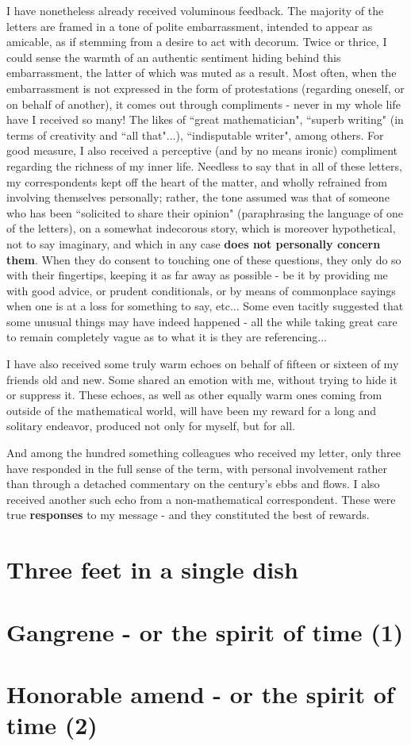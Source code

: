 I have nonetheless already received voluminous feedback. The majority of the letters are framed in a tone of polite embarrassment, intended to appear as amicable, as if stemming from a desire to act with decorum. Twice or thrice, I could sense the warmth of an authentic sentiment hiding behind this embarrassment, the latter of which was muted as a result. Most often, when the embarrassment is not expressed in the form of protestations (regarding oneself, or on behalf of another), it comes out through compliments - never in my whole life have I received so many! The likes of ``great mathematician", ``superb writing" (in terms of creativity and ``all that"...), ``indisputable writer", among others. For good measure, I also received a perceptive (and by no means ironic) compliment regarding the richness of my inner life. Needless to say that in all of these letters, my correspondents kept off the heart of the matter, and wholly refrained from involving themselves personally; rather, the tone assumed was that of someone who has been ``solicited to share their opinion" (paraphrasing the language of one of the letters), on a somewhat indecorous story, which is moreover hypothetical, not to say imaginary, and which in any case \textbf{does not personally concern them}. When they do consent to touching one of these questions, they only do so with their fingertips, keeping it as far away as possible - be it by providing me with good advice, or prudent conditionals, or by means of commonplace sayings when one is at a loss for something to say, etc... Some even tacitly suggested that some unusual things may have indeed happened - all the while taking great care to remain completely vague as to what it is they are referencing...

I have also received some truly warm echoes on behalf of fifteen or sixteen of my friends old and new. Some shared an emotion with me, without trying to hide it or suppress it. These echoes, as well as other equally warm ones coming from outside of the mathematical world, will have been my reward for a long and solitary endeavor, produced not only for myself, but for all.

And among the hundred something colleagues who received my letter, only three have responded in the full sense of the term, with personal involvement rather than through a detached commentary on the century's ebbs and flows. I also received another such echo from a non-mathematical correspondent. These were true \textbf{responses} to my message - and they constituted the best of rewards.

\section{Three feet in a single dish}

\section{Gangrene - or the spirit of time (1)}

\section{Honorable amend - or the spirit of time (2)}










%
